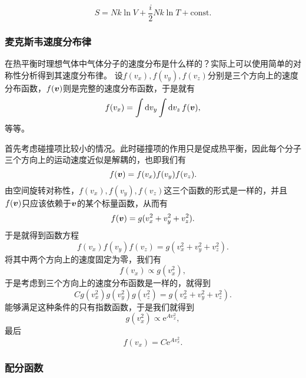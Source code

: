 \documentclass[hyperref, UTF8, a4paper]{ctexart}
\newcommand*{\ee}{\mathrm{e}}
\newcommand*{\const}{\mathrm{const}}
\begin{document}
\begin{equation}
    S = Nk \ln V + \frac{i}{2} Nk \ln T + \const.
    \label{eq:entropy-from-thermodynamics}
\end{equation}

\subsubsection{麦克斯韦速度分布律}

在热平衡时理想气体中气体分子的速度分布是什么样的？实际上可以使用简单的对称性分析得到其速度分布律。
设$f(v_x),f(v_y),f(v_z)$分别是三个方向上的速度分布函数，$f(\vb*{v})$则是完整的速度分布函数，于是就有
\[
    f(v_x) = \int \dd{v_y} \int \dd{v_z} f(\vb*{v}),
\]
等等。

首先考虑碰撞项比较小的情况。此时碰撞项的作用只是促成热平衡，因此每个分子三个方向上的运动速度近似是解耦的，也即我们有
\[
    f(\vb*{v}) = f(v_x) f(v_y) f(v_z).
\]
由空间旋转对称性，$f(v_x),f(v_y),f(v_z)$这三个函数的形式是一样的，并且$f(\vb*{v})$只应该依赖于$\vb*{v}$的某个标量函数，从而有
\[
    f(\vb*{v}) = g(v_x^2+v_y^2+v_z^2).
\]
于是就得到函数方程
\[
    f(v_x) f(v_y) f(v_z) = g(v_x^2+v_y^2+v_z^2).
\]
将其中两个方向上的速度固定为零，我们有
\[
    f(v_x) \propto g(v_x^2),
\]
于是考虑到三个方向上的速度分布函数是一样的，就得到
\[
    C g(v_x^2) g(v_y^2) g(v_z^2) = g(v_x^2+v_y^2+v_z^2).
\]
能够满足这种条件的只有指数函数，于是我们就得到
\[
    g(v_x^2) \propto \ee^{A v_x^2},
\]
最后
\[
    f(v_x) = C \ee^{A v_x^2}.
\]

\subsubsection{配分函数}
\end{document}
